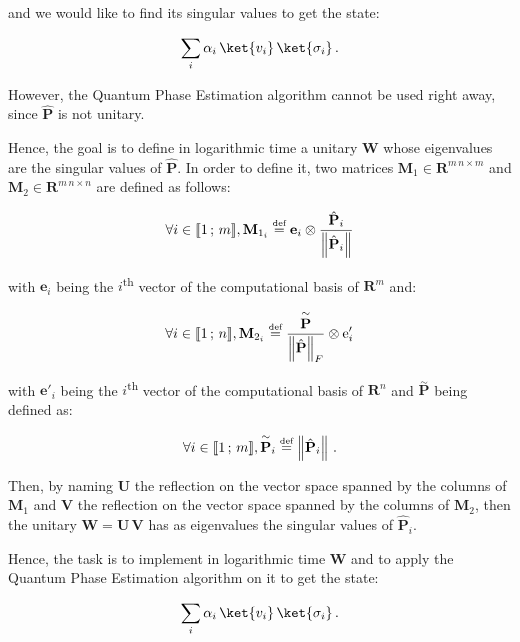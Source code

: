 \documentclass[11pt, a4paper]{article}
\begin{document}
                and we would like to find its singular values to get the state:
                
                \[\sum_{i}\alpha_i\,\ket{v_i}\,\ket{\sigma_i}\,.\]
                
                However, the Quantum Phase Estimation algorithm cannot be used right away, since \(\hat{\mathbf{P}}\) is not unitary.
                
                Hence, the goal is to define in logarithmic time a unitary \(\mathbf{W}\) whose eigenvalues are the singular values of \(\hat{\mathbf{P}}\). In order to define it, two matrices \(\mathbf{M}_1\in\mathbf{R}^{m\,n\times m}\) and \(\mathbf{M}_2\in\mathbf{R}^{m\,n\times n}\) are defined as follows:
                
                \[\forall i\in\llbracket1\,;\,m\rrbracket,\mathbf{M}_{1_i}\overset{\text{\tiny{def}}}{=}\mathbf{e}_i\otimes\frac{\hat{\mathbf{P}}_i}{\left\|\hat{\mathbf{P}}_i\right\|}\]
                
                with \(\mathbf{e}_i\) being the \(i\)\textsuperscript{th} vector of the computational basis of \(\mathbf{R}^{m}\) and:
                
                \[\forall i\in\llbracket1\,;\,n\rrbracket,\mathbf{M}_{2_i}\overset{\text{\tiny{def}}}{=}\frac{\overset{\sim}{\mathbf{P}}}{\left\|\hat{\mathbf{P}}\right\|_F}\otimes\mathrm{e}'_i\]
                
                with \(\mathbf{e}'_i\) being the \(i\)\textsuperscript{th} vector of the computational basis of \(\mathbf{R}^{n}\) and \(\overset{\sim}{\mathbf{P}}\) being defined as:
                
                \[\forall i\in\llbracket1\,;\,m\rrbracket,\overset{\sim}{\mathbf{P}}_i\overset{\text{\tiny{def}}}{=}\left\|\hat{\mathbf{P}}_i\right\|\,.\]
                
                Then, by naming \(\mathbf{U}\) the reflection on the vector space spanned by the columns of \(\mathbf{M}_1\) and \(\mathbf{V}\) the reflection on the vector space spanned by the columns of \(\mathbf{M}_2\), then the unitary \(\mathbf{W} = \mathbf{U}\,\mathbf{V}\) has as eigenvalues the singular values of \(\hat{\mathbf{P}}_i\).
                
                Hence, the task is to implement in logarithmic time \(\mathbf{W}\) and to apply the Quantum Phase Estimation algorithm on it to get the state:
                
                \[\sum_{i}\alpha_i\,\ket{v_i}\,\ket{\sigma_i}\,.\]
                
\end{document}
